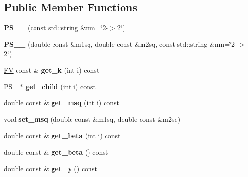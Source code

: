 \subsection*{Public Member Functions}
\begin{DoxyCompactItemize}
\item 
\hypertarget{classPS__2__2_a2c69fba98e2519e9247f8052b642dcdc}{}{\bfseries P\+S\+\_\+\_} (const std\+::string \&nm=\char`\"{}2-\/$>$2\char`\"{})\label{classPS__2__2_a2c69fba98e2519e9247f8052b642dcdc}

\item 
\hypertarget{classPS__2__2_a9656aed0fb1409f829f84f1c568ced85}{}{\bfseries P\+S\+\_\+\_} (double const \&m1sq, double const \&m2sq, const std\+::string \&nm=\char`\"{}2-\/$>$2\char`\"{})\label{classPS__2__2_a9656aed0fb1409f829f84f1c568ced85}

\item 
\hypertarget{classPS__2__2_a27f5570839ad56e039feb1b693c47fc4}{}\hyperlink{classFV}{F\+V} const \& {\bfseries get\+\_\+k} (int i) const \label{classPS__2__2_a27f5570839ad56e039feb1b693c47fc4}

\item 
\hypertarget{classPS__2__2_a75fb8afaac5a5feb3f914fd0bfbcc7b3}{}\hyperlink{classPS__2}{P\+S\+\_} $\ast$ {\bfseries get\+\_\+child} (int i) const \label{classPS__2__2_a75fb8afaac5a5feb3f914fd0bfbcc7b3}

\item 
\hypertarget{classPS__2__2_a038add35c67f07679dea7cb99831296c}{}double const \& {\bfseries get\+\_\+msq} (int i) const \label{classPS__2__2_a038add35c67f07679dea7cb99831296c}

\item 
\hypertarget{classPS__2__2_ae781b2b360acc3f902c91eef23ca1a80}{}void {\bfseries set\+\_\+msq} (double const \&m1sq, double const \&m2sq)\label{classPS__2__2_ae781b2b360acc3f902c91eef23ca1a80}

\item 
\hypertarget{classPS__2__2_a1fff415d89393fe3817d033ca94cddfc}{}double const \& {\bfseries get\+\_\+beta} (int i) const \label{classPS__2__2_a1fff415d89393fe3817d033ca94cddfc}

\item 
\hypertarget{classPS__2__2_accd43c9b6a1ad37cd7730ce42302b2f4}{}double const \& {\bfseries get\+\_\+beta} () const \label{classPS__2__2_accd43c9b6a1ad37cd7730ce42302b2f4}

\item 
\hypertarget{classPS__2__2_a31d25d54497c8dded3c57c117c59dbd6}{}double const \& {\bfseries get\+\_\+y} () const \label{classPS__2__2_a31d25d54497c8dded3c57c117c59dbd6}


\end{DoxyCompactItemize}
